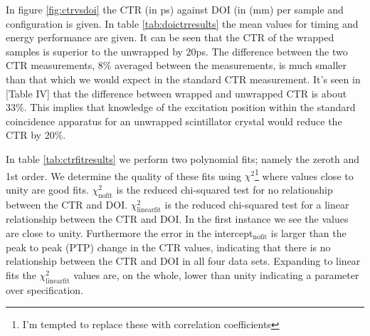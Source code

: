 In figure \ref{fig:ctrvsdoi} the CTR (in ps) against DOI (in (mm) per sample and configuration is given. In table \ref{tab:doictrresults} the mean values for timing and energy performance are given. It can be seen that the CTR of the wrapped samples is superior to the unwrapped by 20ps. The difference between the two CTR measurements, 8\% averaged between the measurements, is much smaller than that which we would expect in the standard CTR measurement. It's seen in [Table IV]\cite{r_Paganoni_Pauwels_et_al__2011} that the difference between wrapped and unwrapped CTR is about 33\%. This implies that knowledge of the excitation position within the standard coincidence apparatus for an unwrapped scintillator crystal would reduce the CTR by 20\%. 

In table \ref{tab:ctrfitresults} we perform two polynomial fits; namely the zeroth and 1st order. We determine the quality of these fits using $\chi^2$\footnote{I'm tempted to replace these with correlation coefficients} where values close to unity are good fits. $\chi^2_\text{nofit}$ is the reduced chi-squared test for no relationship between the CTR and DOI. $\chi^2_\text{linearfit}$ is the reduced chi-squared test for a linear relationship between the CTR and DOI. In the first instance we see the values are close to unity. Furthermore the error in the intercept$_\text{nofit}$ is larger than the peak to peak (PTP) change in the CTR values, indicating that there is no relationship between the CTR and DOI in all four data sets. Expanding to linear fits the $\chi^2_\text{linearfit}$ values are, on the whole, lower than unity indicating a parameter over specification.